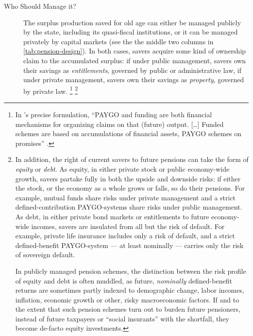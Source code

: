 \begin{description}
	\item[Who Should Manage it?]
	The surplus production saved for old age can either be managed publicly by the state, including its quasi-fiscal institutions, or it can be managed privately by capital markets (see the the middle two columns in \autoref{tab:pension-design}).
	In both cases, savers acquire some kind of ownership claim to the accumulated surplus:
	if under public management, savers own their savings as \emph{entitlements}, governed by public or administrative law, if under private management, savers own their savings as \emph{property}, governed by private law.
	\footnote{
		In \citeauthor{Barr2005a}'s precise formulation, ``PAYGO and funding are both financial mechanisms for organizing claims on that (future) output.
		[\ldots]
		Funded schemes are based on accumulations of financial assets, PAYGO schemes on promises'' \citeyearpar[157]{Barr2005a}.
	}
	\footnote{
		In addition, the right of current savers to future pensions can take the form of \emph{equity} or \emph{debt}.
		As equity, in either private stock or public economy-wide growth, savers partake fully in both the upside and downside risks:
		if either the stock, or the economy as a whole grows or falls, so do their pensions.
		For example, mutual funds share risks under private management and a strict defined-contribution PAYGO-systems share risks under public management.
		As debt, in either private bond markets or entitlements to future economy-wide incomes, savers are insulated from all but the risk of default.
		For example, private life insurance includes only a risk of default, and a strict defined-benefit PAYGO-system --- at least nominally --- carries only the risk of sovereign default.

		In publicly managed pension schemes, the distinction between the risk profile of equity and debt is often muddled, as future, \emph{nominally} defined-benefit returns are sometimes partly indexed to demographic change, labor incomes, inflation, economic growth or other, risky macroeconomic factors.
		If and to the extent that such pension schemes turn out to burden future pensioners, instead of future taxpayers or ``social insurants'' with the shortfall, they become de-facto equity investments.

}
\end{description}
